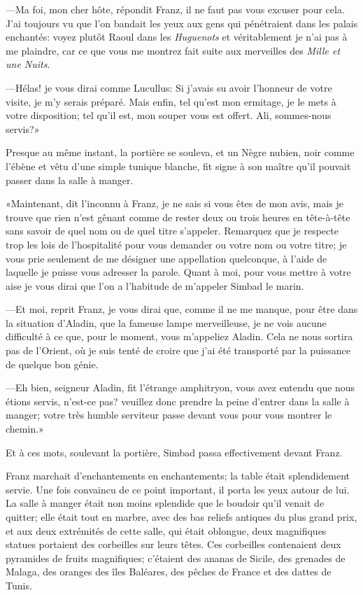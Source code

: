 —Ma foi, mon cher hôte, répondit Franz, il ne faut pas vous excuser pour cela. J'ai toujours vu que l'on bandait les yeux aux gens qui pénétraient dans les palais enchantés: voyez plutôt Raoul dans les \textit{Huguenots} et véritablement je n'ai pas à me plaindre, car ce que vous me montrez fait suite aux merveilles des \textit{Mille et une Nuits}.

—Hélas! je vous dirai comme Lucullus: Si j'avais su avoir l'honneur de votre visite, je m'y serais préparé. Mais enfin, tel qu'est mon ermitage, je le mets à votre disposition; tel qu'il est, mon souper vous est offert. Ali, sommes-nous servis?»

Presque au même instant, la portière se souleva, et un Nègre nubien, noir comme l'ébène et vêtu d'une simple tunique blanche, fit signe à son maître qu'il pouvait passer dans la salle à manger.

«Maintenant, dit l'inconnu à Franz, je ne sais si vous êtes de mon avis, mais je trouve que rien n'est gênant comme de rester deux ou trois heures en tête-à-tête sans savoir de quel nom ou de quel titre s'appeler. Remarquez que je respecte trop les lois de l'hospitalité pour vous demander ou votre nom ou votre titre; je vous prie seulement de me désigner une appellation quelconque, à l'aide de laquelle je puisse vous adresser la parole. Quant à moi, pour vous mettre à votre aise je vous dirai que l'on a l'habitude de m'appeler Simbad le marin.

—Et moi, reprit Franz, je vous dirai que, comme il ne me manque, pour être dans la situation d'Aladin, que la fameuse lampe merveilleuse, je ne vois aucune difficulté à ce que, pour le moment, vous m'appeliez Aladin. Cela ne nous sortira pas de l'Orient, où je suis tenté de croire que j'ai été transporté par la puissance de quelque bon génie.

—Eh bien, seigneur Aladin, fit l'étrange amphitryon, vous avez entendu que nous étions servis, n'est-ce pas? veuillez donc prendre la peine d'entrer dans la salle à manger; votre très humble serviteur passe devant vous pour vous montrer le chemin.»

Et à ces mots, soulevant la portière, Simbad passa effectivement devant Franz.

Franz marchait d'enchantements en enchantements; la table était splendidement servie. Une fois convaincu de ce point important, il porta les yeux autour de lui. La salle à manger était non moins splendide que le boudoir qu'il venait de quitter; elle était tout en marbre, avec des bas reliefs antiques du plus grand prix, et aux deux extrémités de cette salle, qui était oblongue, deux magnifiques statues portaient des corbeilles sur leurs têtes. Ces corbeilles contenaient deux pyramides de fruits magnifiques; c'étaient des ananas de Sicile, des grenades de Malaga, des oranges des îles Baléares, des pêches de France et des dattes de Tunis.

